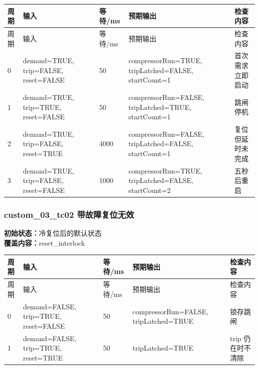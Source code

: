 \begin{longtable}{L{1.0cm}L{4.7cm}L{1.4cm}L{4.0cm}L{2.1cm}}

\toprule

周期 & 输入 & 等待/ms & 预期输出 & 检查内容\\

\midrule

\endfirsthead

\toprule

周期 & 输入 & 等待/ms & 预期输出 & 检查内容\\

\midrule

\endhead

0 & demand=TRUE, trip=FALSE, reset=FALSE & 50 & compressorRun=TRUE, tripLatched=FALSE, startCount=1 & 首次需求立即启动\\

1 & demand=TRUE, trip=TRUE, reset=FALSE & 50 & compressorRun=FALSE, tripLatched=TRUE, startCount=1 & 跳闸停机\\

2 & demand=TRUE, trip=FALSE, reset=TRUE & 4000 & compressorRun=FALSE, tripLatched=FALSE, startCount=1 & 复位但延时未完成\\

3 & demand=TRUE, trip=FALSE, reset=FALSE & 1000 & compressorRun=TRUE, tripLatched=FALSE, startCount=2 & 五秒后重启\\

\bottomrule

\end{longtable}

\subsubsection{{\ttfamily custom\_03\_tc02} 带故障复位无效}

\noindent\textbf{初始状态：}冷复位后的默认状态\\

\textbf{覆盖内容：}reset\_interlock

\begin{longtable}{L{1.0cm}L{4.7cm}L{1.4cm}L{4.0cm}L{2.1cm}}

\toprule

周期 & 输入 & 等待/ms & 预期输出 & 检查内容\\

\midrule

\endfirsthead

\toprule

周期 & 输入 & 等待/ms & 预期输出 & 检查内容\\

\midrule

\endhead

0 & demand=FALSE, trip=TRUE, reset=FALSE & 50 & compressorRun=FALSE, tripLatched=TRUE & 锁存跳闸\\

1 & demand=FALSE, trip=TRUE, reset=TRUE & 50 & tripLatched=TRUE & trip 仍在时不清除\\

\bottomrule

\end{longtable}

